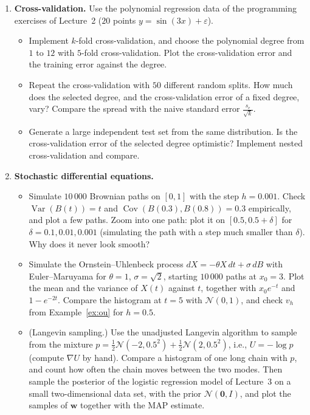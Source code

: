 \documentclass[11pt]{article}
\DeclareMathOperator{\Var}{Var}
\DeclareMathOperator{\Cov}{Cov}
\theoremstyle{definition}
\theoremstyle{plain}
\theoremstyle{remark}
\begin{document}
\begin{enumerate}[label=\textbf{P\arabic*.}, leftmargin=*]
    \item \textbf{Cross-validation.} Use the polynomial regression data of the programming exercises of Lecture~2 ($20$ points $y = \sin(3x) + \varepsilon$).
    \begin{itemize}
        \item Implement $k$-fold cross-validation, and choose the polynomial degree from $1$ to $12$ with $5$-fold cross-validation. Plot the cross-validation error and the training error against the degree.
        \item Repeat the cross-validation with $50$ different random splits. How much does the selected degree, and the cross-validation error of a fixed degree, vary? Compare the spread with the naive standard error $\frac{s_e}{\sqrt{k}}$.
        \item Generate a large independent test set from the same distribution. Is the cross-validation error of the selected degree optimistic? Implement nested cross-validation and compare.
    \end{itemize}

    \item \textbf{Stochastic differential equations.}
    \begin{itemize}
        \item Simulate $10\,000$ Brownian paths on $[0, 1]$ with the step $h = 0.001$. Check $\Var(B(t)) = t$ and $\Cov(B(0.3), B(0.8)) = 0.3$ empirically, and plot a few paths. Zoom into one path: plot it on $[0.5, 0.5 + \delta]$ for $\delta = 0.1, 0.01, 0.001$ (simulating the path with a step much smaller than $\delta$). Why does it never look smooth?
        \item Simulate the Ornstein--Uhlenbeck process $dX = -\theta X\,dt + \sigma\,dB$ with Euler--Maruyama for $\theta = 1$, $\sigma = \sqrt{2}$, starting $10\,000$ paths at $x_0 = 3$. Plot the mean and the variance of $X(t)$ against $t$, together with $x_0e^{-t}$ and $1 - e^{-2t}$. Compare the histogram at $t = 5$ with $\mathcal{N}(0, 1)$, and check $v_h$ from Example~\ref{ex:ou} for $h = 0.5$.
        \item (Langevin sampling.) Use the unadjusted Langevin algorithm to sample from the mixture $p = \frac{1}{2}\mathcal{N}(-2, 0.5^2) + \frac{1}{2}\mathcal{N}(2, 0.5^2)$, i.e., $U = -\log p$ (compute $\nabla U$ by hand). Compare a histogram of one long chain with $p$, and count how often the chain moves between the two modes. Then sample the posterior of the logistic regression model of Lecture~3 on a small two-dimensional data set, with the prior $\mathcal{N}(\mathbf{0}, I)$, and plot the samples of $\mathbf{w}$ together with the MAP estimate.
    \end{itemize}


\end{enumerate}
\end{document}
